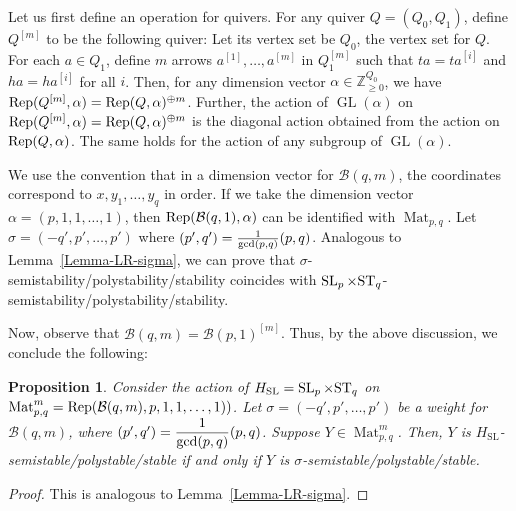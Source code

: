 \documentclass[11pt]{amsart}
\newtheorem{proposition}[theorem]{Proposition}
\theoremstyle{definition}
\newcommand{\Rep}{{\rm Rep}}
\newcommand{\ST}{{\rm ST}}
\newcommand{\Z}{{\mathbb Z}}
\newcommand{\Mat}{\operatorname{Mat}}
\newcommand{\GL}{\operatorname{GL}}
\newcommand{\SL}{\operatorname{SL}}
\begin{document}
Let us first define an operation for quivers. For any quiver $Q = (Q_0,Q_1)$, define $Q^{[m]}$ to be the following quiver: Let its vertex set be $Q_0$, the vertex set for $Q$. For each $a \in Q_1$, define $m$ arrows $a^{[1]},\dots,a^{[m]}$ in $Q^{[m]}_1$ such that $ta = ta^{[i]}$ and $ha = ha^{[i]}$ for all $i$. Then, for any dimension vector $\alpha \in \Z_{\geq 0}^{Q_0}$, we have $\Rep(Q^{[m]},\alpha) = \Rep(Q,\alpha)^{\oplus m}$. Further, the action of $\GL(\alpha)$ on $\Rep(Q^{[m]},\alpha) = \Rep(Q,\alpha)^{\oplus m}$ is the diagonal action obtained from the action on $\Rep(Q,\alpha)$. The same holds for the action of any subgroup of $\GL(\alpha)$.

We use the convention that in a dimension vector for $\mathcal{B}(q,m)$, the coordinates correspond to $x,y_1,\dots,y_q$ in order. If we take the dimension vector $\alpha = (p,1,1,\dots,1)$, then $\Rep(\mathcal{B}(q,1),\alpha)$ can be identified with $\Mat_{p,q}$. Let $\sigma = (- q',p',\dots,p')$ where $(p',q') = \frac{1}{{\rm gcd}(p,q)} (p,q)$. Analogous to Lemma~\ref{Lemma-LR-sigma}, we can prove that $\sigma$-semistability/polystability/stability coincides with $\SL_p \times \ST_q$-semistability/polystability/stability.





Now, observe that $\mathcal{B}(q,m) = \mathcal{B}(p,1)^{[m]}$. Thus, by the above discussion, we conclude the following:

\begin{proposition}
Consider the action of $H_{\SL} = \SL_p \times \ST_q$ on $\Mat_{p,q}^m = \Rep(\mathcal{B}(q,m),p, 1,1,\dots,1))$. Let $\sigma = (-q',p',\dots,p')$ be a weight for $\mathcal{B}(q,m)$, where $(p',q') = \displaystyle\frac{1}{{\rm gcd}(p,q)} (p,q)$. 
Suppose $Y \in \Mat_{p,q}^m$. Then, $Y$ is $H_{\SL}$-semistable/polystable/stable if and only if $Y$ is $\sigma$-semistable/polystable/stable.
\end{proposition}

\begin{proof}
This is analogous to Lemma~\ref{Lemma-LR-sigma}.
\end{proof}
\end{document}
